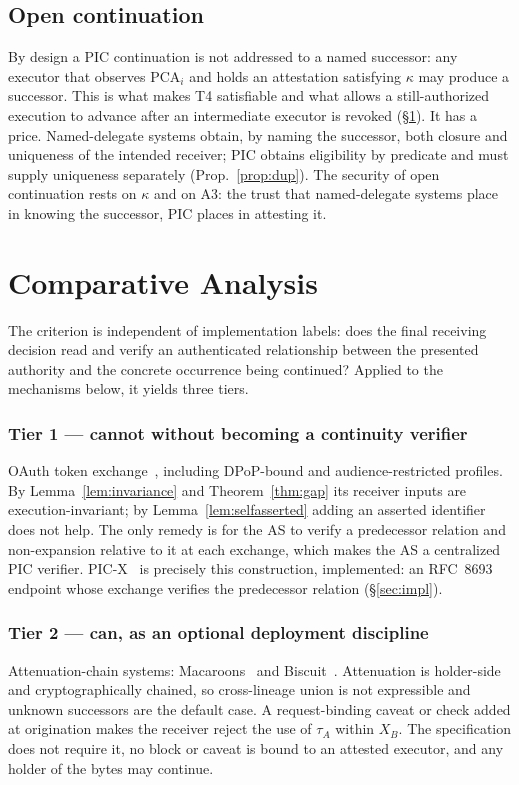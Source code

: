 \documentclass[conference]{IEEEtran}
\begin{document}
\subsection{Open continuation}
By design a PIC continuation is not addressed to a named successor: any executor that observes $\mathrm{PCA}_i$ and holds an attestation satisfying $\kappa$ may produce a successor. This is what makes T4 satisfiable and what allows a still-authorized execution to advance after an intermediate executor is revoked (\S\ref{sec:comparison}). It has a price. Named-delegate systems obtain, by naming the successor, both closure and uniqueness of the intended receiver; PIC obtains eligibility by predicate and must supply uniqueness separately (Prop.~\ref{prop:dup}). The security of open continuation rests on $\kappa$ and on A3: the trust that named-delegate systems place in knowing the successor, PIC places in attesting it.

\section{Comparative Analysis}\label{sec:comparison}

The criterion is independent of implementation labels: does the final receiving decision read and verify an authenticated relationship between the presented authority and the concrete occurrence being continued? Applied to the mechanisms below, it yields three tiers.

\subsubsection*{Tier 1 --- cannot without becoming a continuity verifier}
OAuth token exchange~\cite{rfc8693}, including DPoP-bound and audience-restricted profiles. By Lemma~\ref{lem:invariance} and Theorem~\ref{thm:gap} its receiver inputs are execution-invariant; by Lemma~\ref{lem:selfasserted} adding an asserted identifier does not help. The only remedy is for the AS to verify a predecessor relation and non-expansion relative to it at each exchange, which makes the AS a centralized PIC verifier. PIC-X~\cite{picx} is precisely this construction, implemented: an RFC~8693 endpoint whose exchange verifies the predecessor relation (\S\ref{sec:impl}).
\subsubsection*{Tier 2 --- can, as an optional deployment discipline}
Attenuation-chain systems: Macaroons~\cite{macaroons} and Biscuit~\cite{biscuit}. Attenuation is holder-side and cryptographically chained, so cross-lineage union is not expressible and unknown successors are the default case. A request-binding caveat or check added at origination makes the receiver reject the use of $\tau_A$ within $X_B$. The specification does not require it, no block or caveat is bound to an attested executor, and any holder of the bytes may continue.
\end{document}

